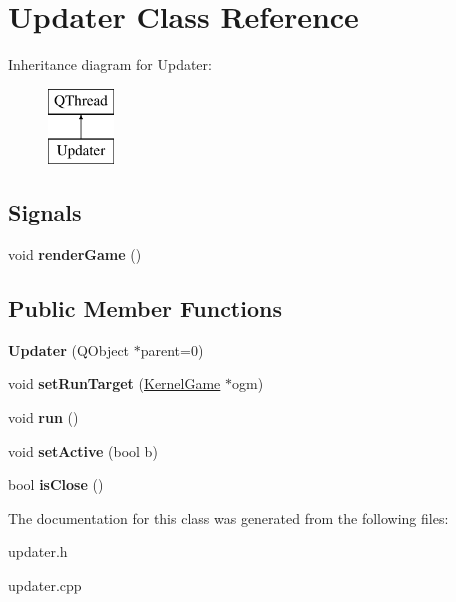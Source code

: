 \hypertarget{class_updater}{\section{Updater Class Reference}
\label{class_updater}
}
Inheritance diagram for Updater\-:\begin{figure}[H]
\begin{center}
\leavevmode
\includegraphics[height=2.000000cm]{class_updater}
\end{center}
\end{figure}
\subsection*{Signals}
\begin{DoxyCompactItemize}
\item 
\hypertarget{class_updater_aa443259cbce530ab39679cbe0220ad55}{void {\bfseries render\-Game} ()}\label{class_updater_aa443259cbce530ab39679cbe0220ad55}

\end{DoxyCompactItemize}
\subsection*{Public Member Functions}
\begin{DoxyCompactItemize}
\item 
\hypertarget{class_updater_adb60a473bc174de0ee06ee09c814e1a2}{{\bfseries Updater} (Q\-Object $\ast$parent=0)}\label{class_updater_adb60a473bc174de0ee06ee09c814e1a2}

\item 
\hypertarget{class_updater_a98324b20b804c73f2cb33fc01afd29fb}{void {\bfseries set\-Run\-Target} (\hyperlink{class_kernel_game}{Kernel\-Game} $\ast$ogm)}\label{class_updater_a98324b20b804c73f2cb33fc01afd29fb}

\item 
\hypertarget{class_updater_abd76987a878910ff4687cac6cd63859d}{void {\bfseries run} ()}\label{class_updater_abd76987a878910ff4687cac6cd63859d}

\item 
\hypertarget{class_updater_aa115005ac2d83eead9c9ffd00a2faae7}{void {\bfseries set\-Active} (bool b)}\label{class_updater_aa115005ac2d83eead9c9ffd00a2faae7}

\item 
\hypertarget{class_updater_a055c8c65e3a0d7bd5af22f51f0541ba2}{bool {\bfseries is\-Close} ()}\label{class_updater_a055c8c65e3a0d7bd5af22f51f0541ba2}

\end{DoxyCompactItemize}


The documentation for this class was generated from the following files\-:\begin{DoxyCompactItemize}
\item 
updater.\-h\item 
updater.\-cpp\end{DoxyCompactItemize}

